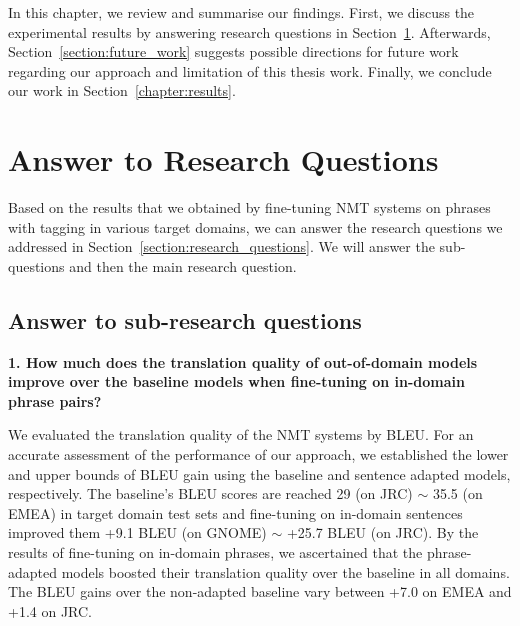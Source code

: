 In this chapter, we review and summarise our findings. First, we discuss the experimental results by answering research questions in Section~\ref{section:answer_question}. Afterwards, Section~\ref{section:future_work} suggests possible directions for future work regarding our approach and limitation of this thesis work. Finally, we conclude our work in Section~\ref{chapter:results}. 


\section{Answer to Research Questions}\label{section:answer_question}

Based on the results that we obtained by fine-tuning NMT systems on phrases with tagging in various target domains, we can answer the research questions we addressed in Section~\ref{section:research_questions}. We will answer the sub-questions and then the main research question.

\subsection{Answer to sub-research questions}

\noindent \textbf{1. How much does the translation quality of out-of-domain models improve over the baseline models when fine-tuning on in-domain phrase pairs?}

\bigskip

We evaluated the translation quality of the NMT systems by BLEU. For an accurate assessment of the performance of our approach, we established the lower and upper bounds of BLEU gain using the baseline and sentence adapted models, respectively. The baseline's BLEU scores are reached 29 (on JRC) $\sim$ 35.5 (on EMEA) in target domain test sets and fine-tuning on in-domain sentences improved them +9.1 BLEU (on GNOME) $\sim$ +25.7 BLEU (on JRC). By the results of fine-tuning on in-domain phrases, we ascertained that the phrase-adapted models boosted their translation quality over the baseline in all domains. The BLEU gains over the non-adapted baseline vary between +7.0 on EMEA and +1.4 on JRC.

